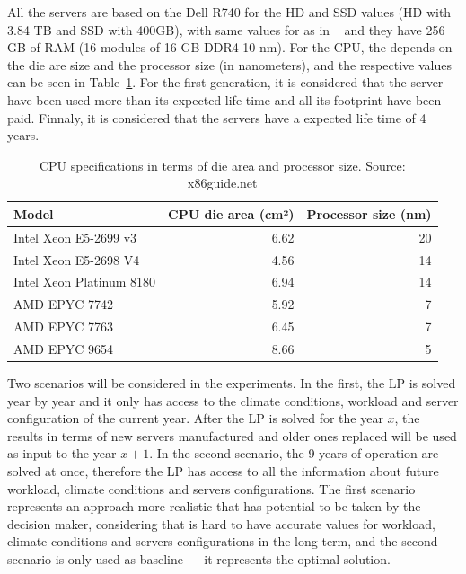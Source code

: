 All the servers are based on the Dell R740 for the HD and SSD values (HD with 3.84 TB and SSD with 400GB), with same values for  as in ~\cite{gupta2022_ACT} and they have 256 GB of RAM (16 modules of 16 GB DDR4 10 nm). For the CPU, the  depends on the die are size and the processor size (in nanometers), and the respective values can be seen in Table~\ref{tab:cpu_specs}. For the first generation, it is considered that the server have been used more than its expected life time and all its  footprint have been paid. Finnaly, it is considered that the servers have a expected life time of 4 years.

\begin{table}[H]
  \small
  \caption{CPU specifications in terms of die area and processor size. Source: x86guide.net} \centering
  \label{tab:cpu_specs} 
  \begin{tabular}{|l|r|r|}
   \hline

  \textbf{Model}  & \textbf{CPU die area (cm²)} & \textbf{Processor size (nm)} \\
  \hline
    Intel Xeon E5-2699 v3& 6.62  & 20  \\
  \hline
    Intel Xeon E5-2698 V4 & 4.56 & 14\\
  \hline
    Intel Xeon Platinum 8180 & 6.94 & 14\\
  \hline
    AMD EPYC 7742  & 5.92 & 7 \\
  \hline
    AMD EPYC 7763 & 6.45   & 7 \\
  \hline
    AMD EPYC 9654 & 8.66 & 5 \\
  \hline
\end{tabular}  
\end{table}


Two scenarios will be considered in the experiments. In the first, the LP is solved year by year and it only has access to the climate conditions, workload and server configuration of the current year. After the LP is solved for the year $x$, the results in terms of new servers manufactured and older ones replaced will be used as input to the year $x +1$. In the second scenario, the 9 years of operation are solved at once, therefore the LP has access to all the information about future workload, climate conditions and servers configurations. The first scenario represents an approach more realistic that has potential to be taken by the decision maker, considering that is hard to have accurate values for workload, climate conditions and servers configurations in the long term, and the second scenario is only used as baseline --- it represents the optimal solution.

